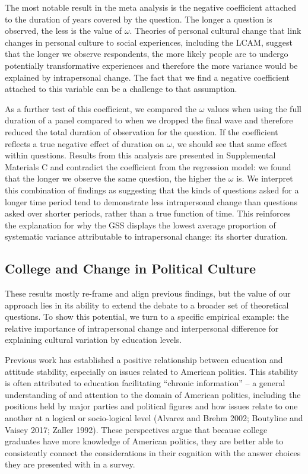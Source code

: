\documentclass[
  12pt,
]{article}
\begin{document}
The most notable result in the meta analysis is the negative coefficient
attached to the duration of years covered by the question. The longer a
question is observed, the less is the value of \(\omega\). Theories of
personal cultural change that link changes in personal culture to social
experiences, including the LCAM, suggest that the longer we observe
respondents, the more likely people are to undergo potentially
transformative experiences and therefore the more variance would be
explained by intrapersonal change. The fact that we find a negative
coefficient attached to this variable can be a challenge to that
assumption.

As a further test of this coefficient, we compared the \(\omega\) values
when using the full duration of a panel compared to when we dropped the
final wave and therefore reduced the total duration of observation for
the question. If the coefficient reflects a true negative effect of
duration on \(\omega\), we should see that same effect within questions.
Results from this analysis are presented in Supplemental Materials C and
contradict the coefficient from the regression model: we found that the
longer we observe the same question, the higher the \(\omega\) is. We
interpret this combination of findings as suggesting that the kinds of
questions asked for a longer time period tend to demonstrate less
intrapersonal change than questions asked over shorter periods, rather
than a true function of time. This reinforces the explanation for why
the GSS displays the lowest average proportion of systematic variance
attributable to intrapersonal change: its shorter duration.

\hypertarget{college-and-change-in-political-culture}{%
\subsection{College and Change in Political
Culture}\label{college-and-change-in-political-culture}}

These results mostly re-frame and align previous findings, but the value
of our approach lies in its ability to extend the debate to a broader
set of theoretical questions. To show this potential, we turn to a
specific empirical example: the relative importance of intrapersonal
change and interpersonal difference for explaining cultural variation by
education levels.

Previous work has established a positive relationship between education
and attitude stability, especially on issues related to American
politics. This stability is often attributed to education facilitating
``chronic information'' -- a general understanding of and attention to
the domain of American politics, including the positions held by major
parties and political figures and how issues relate to one another at a
logical or socio-logical level (Alvarez and Brehm 2002; Boutyline and
Vaisey 2017; Zaller 1992). These perspectives argue that because college
graduates have more knowledge of American politics, they are better able
to consistently connect the considerations in their cognition with the
answer choices they are presented with in a survey.
\end{document}
